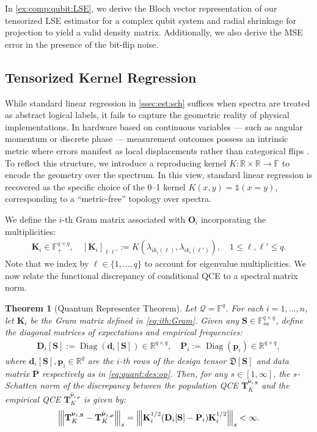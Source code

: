 \documentclass[noinfoline]{imsart}\setcounter{tocdepth}{2}
\renewcommand{\b}[1]{\mathbb{#1}} %
\newcommand{\m}[1]{\mathbf{#1}} %
\newcommand{\f}[1]{\mathfrak{#1}} %
\renewcommand{\c}[1]{\mathcal{#1}} %
\newcommand{\ds}[1]{\mathds{#1}} %
\newcommand{\mb}[1]{\boldsymbol{#1}} %
\newcommand{\vertiii}[1]{{\left\vert\kern-0.25ex\left\vert\kern-0.25ex\left\vert #1 
    \right\vert\kern-0.25ex\right\vert\kern-0.25ex\right\vert}} %
\newcommand{\Diag}{\operatorname{Diag}}
\theoremstyle{plain}
\newtheorem{theorem}{Theorem}[section]
\begin{document}
In \cref{ex:comp:qubit:LSE}, we derive the Bloch vector representation of our tensorized LSE estimator for a complex qubit system and radial shrinkage for projection to yield a valid density matrix. Additionally, we also derive the MSE error in the presence of the bit-flip noise.

\subsection{Tensorized Kernel Regression}\label{ssec:est:sch:ker}
While standard linear regression in \cref{ssec:est:sch} suffices when spectra are treated as abstract logical labels, it fails to capture the geometric reality of physical implementations. In hardware based on continuous variables --- such as angular momentum \cite{arecchi1972atomic} or discrete phase \cite{pegg1989phase} --- measurement outcomes possess an intrinsic metric where errors manifest as local displacements rather than categorical flips \cite{gottesman2001encoding}. To reflect this structure, we introduce a reproducing kernel $K:\b{R} \times \b{R} \to \b{F}$ to encode the geometry over the spectrum. In this view, standard linear regression is recovered as the specific choice of the 0--1 kernel $K(x, y) = \ds{1} (x = y)$, corresponding to a ``metric-free'' topology over spectra.

We define the $i$-th Gram matrix associated with $\m{O}_{i}$ incorporating the multiplicities:
\begin{align}\label{eq:ith:Gram}
    \m{K}_{i} \in \b{F}_{+}^{q \times q}, \quad [\m{K}_{i}]_{\ell \ell'} := K(\lambda_{i k_{i}(\ell)}, \lambda_{i k_{i}(\ell')}), \quad 1 \le \ell, \ell' \le q.
\end{align}
Note that we index by $\ell \in \{1, \dots, q\}$ to account for eigenvalue multiplicities. We now relate the functional discrepancy of conditional QCE to a spectral matrix norm.

\begin{theorem}[Quantum Representer Theorem]\label{thm:loss:max:eigen}
Let $\c{Q} = \b{F}^{q}$. For each $i = 1, \dots, n$, let $\m{K}_{i}$ be the Gram matrix defined in \eqref{eq:ith:Gram}. Given any $\m{S} \in \b{F}_{sa}^{q \times q}$, define the diagonal matrices of expectations and empirical frequencies:
\begin{align*}
    \m{D}_{i}[\m{S}] := \Diag(\m{d}_{i}[\m{S}])  \in \b{R}^{q \times q}, \quad \m{P}_{i} := \Diag(\m{p}_{i}) \in \b{R}^{q \times q},
\end{align*}
where $\m{d}_{i}[\m{S}], \m{p}_{i} \in \b{R}^{q}$ are the $i$-th rows of the design tensor $\f{D}[\m{S}]$ and data matrix $\m{P}$ respectively as in \eqref{eq:quant:des:op}. Then, for any $s \in [1, \infty]$, the $s$-Schatten norm of the discrepancy between the population QCE $\m{T}_{K}^{\mb{\nu}_{i, \m{S}}}$ and the empirical QCE $\m{T}_{K}^{\hat{\mb{\nu}}_{i, \mb{\rho}}}$ is given by:
\begin{align*}
    \vertiii{\m{T}_{K}^{\mb{\nu}_{i, \m{S}}} - \m{T}_{K}^{\hat{\mb{\nu}}_{i, \mb{\rho}}}}_{s} = \vertiii{\m{K}_{i}^{1/2} (\m{D}_{i}[\m{S}] - \m{P}_{i}) \m{K}_{i}^{1/2}}_{s} < \infty.
\end{align*}
\end{theorem}
\end{document}
